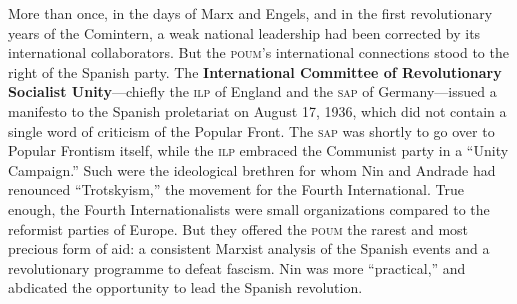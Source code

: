 More than once, in the days of Marx and Engels, and in the first revolutionary years of the Comintern, a weak national leadership had been corrected by its international collaborators. But the \textsc{poum}’s international connections stood to the right of the Spanish party. The \textbf{International Committee of Revolutionary Socialist Unity}---chiefly the \textsc{ilp} of England and the \textsc{sap} of Germany---issued a manifesto to the Spanish proletariat on August 17, 1936, which did not contain a single word of criticism of the Popular Front. The \textsc{sap} was shortly to go over to Popular Frontism itself, while the \textsc{ilp} embraced the Communist party in a ``Unity Campaign.'' Such were the ideological brethren for whom Nin and Andrade had renounced ``Trotskyism,'' the movement for the Fourth International. True enough, the Fourth Internationalists were small organizations compared to the reformist parties of Europe. But they offered the \textsc{poum} the rarest and most precious form of aid: a consistent Marxist analysis of the Spanish events and a revolutionary programme to defeat fascism. Nin was more ``practical,'' and abdicated the opportunity to lead the Spanish revolution.